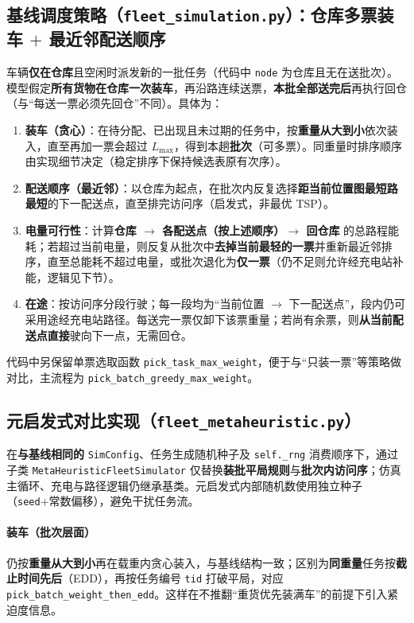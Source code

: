 \documentclass[UTF8,a4paper]{ctexart}
\begin{document}
\subsection[基线调度策略]{基线调度策略（\texttt{fleet\_simulation.py}）：仓库多票装车 $+$ 最近邻配送顺序}
车辆\textbf{仅在仓库}且空闲时派发新的一批任务（代码中 \texttt{node} 为仓库且无在送批次）。模型假定\textbf{所有货物在仓库一次装车}，再沿路连续送票，\textbf{本批全部送完后}再执行回仓（与“每送一票必须先回仓”不同）。具体为：
\begin{enumerate}
  \item \textbf{装车（贪心）}：在待分配、已出现且未过期的任务中，按\textbf{重量从大到小}依次装入，直至再加一票会超过 $L_{\max}$，得到本趟\textbf{批次}（可多票）。同重量时排序顺序由实现细节决定（稳定排序下保持候选表原有次序）。
  \item \textbf{配送顺序（最近邻）}：以仓库为起点，在批次内反复选择\textbf{距当前位置图最短路最短}的下一配送点，直至排完访问序（启发式，非最优 TSP）。
  \item \textbf{电量可行性}：计算\textbf{仓库 $\to$ 各配送点（按上述顺序）$\to$ 回仓库} 的总路程能耗；若超过当前电量，则反复从批次中\textbf{去掉当前最轻的一票}并重新最近邻排序，直至总能耗不超过电量，或批次退化为\textbf{仅一票}（仍不足则允许经充电站补能，逻辑见下节）。
  \item \textbf{在途}：按访问序分段行驶；每一段均为“当前位置 $\to$ 下一配送点”，段内仍可采用途经充电站路径。每送完一票仅卸下该票重量；若尚有余票，则\textbf{从当前配送点直接}驶向下一点，无需回仓。
\end{enumerate}
代码中另保留单票选取函数 \texttt{pick\_task\_max\_weight}，便于与“只装一票”等策略做对比，主流程为 \texttt{pick\_batch\_greedy\_max\_weight}。

\subsection[元启发式对比实现]{元启发式对比实现（\texttt{fleet\_metaheuristic.py}）}
在\textbf{与基线相同的} \texttt{SimConfig}、任务生成随机种子及 \texttt{self.\_rng} 消费顺序下，通过子类 \texttt{MetaHeuristicFleetSimulator} 仅替换\textbf{装批平局规则}与\textbf{批次内访问序}；仿真主循环、充电与路径逻辑仍继承基类。元启发式内部随机数使用独立种子（\texttt{seed}+常数偏移），避免干扰任务流。

\paragraph{装车（批次层面）}
仍按\textbf{重量从大到小}再在载重内贪心装入，与基线结构一致；区别为\textbf{同重量}任务按\textbf{截止时间先后}（EDD），再按任务编号 \texttt{tid} 打破平局，对应 \texttt{pick\_batch\_weight\_then\_edd}。这样在不推翻“重货优先装满车”的前提下引入紧迫度信息。
\end{document}
